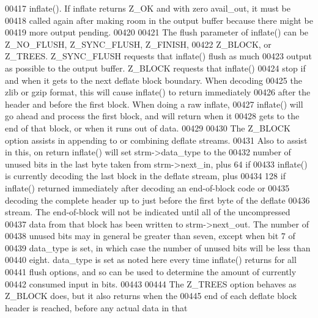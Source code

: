\begin{DoxyCode}
00417 \textcolor{comment}{  inflate().  If inflate returns Z\_OK and with zero avail\_out, it must be}
00418 \textcolor{comment}{  called again after making room in the output buffer because there might be}
00419 \textcolor{comment}{  more output pending.}
00420 \textcolor{comment}{}
00421 \textcolor{comment}{    The flush parameter of inflate() can be Z\_NO\_FLUSH, Z\_SYNC\_FLUSH, Z\_FINISH,}
00422 \textcolor{comment}{  Z\_BLOCK, or Z\_TREES.  Z\_SYNC\_FLUSH requests that inflate() flush as much}
00423 \textcolor{comment}{  output as possible to the output buffer.  Z\_BLOCK requests that inflate()}
00424 \textcolor{comment}{  stop if and when it gets to the next deflate block boundary.  When decoding}
00425 \textcolor{comment}{  the zlib or gzip format, this will cause inflate() to return immediately}
00426 \textcolor{comment}{  after the header and before the first block.  When doing a raw inflate,}
00427 \textcolor{comment}{  inflate() will go ahead and process the first block, and will return when it}
00428 \textcolor{comment}{  gets to the end of that block, or when it runs out of data.}
00429 \textcolor{comment}{}
00430 \textcolor{comment}{    The Z\_BLOCK option assists in appending to or combining deflate streams.}
00431 \textcolor{comment}{  Also to assist in this, on return inflate() will set strm->data\_type to the}
00432 \textcolor{comment}{  number of unused bits in the last byte taken from strm->next\_in, plus 64 if}
00433 \textcolor{comment}{  inflate() is currently decoding the last block in the deflate stream, plus}
00434 \textcolor{comment}{  128 if inflate() returned immediately after decoding an end-of-block code or}
00435 \textcolor{comment}{  decoding the complete header up to just before the first byte of the deflate}
00436 \textcolor{comment}{  stream.  The end-of-block will not be indicated until all of the uncompressed}
00437 \textcolor{comment}{  data from that block has been written to strm->next\_out.  The number of}
00438 \textcolor{comment}{  unused bits may in general be greater than seven, except when bit 7 of}
00439 \textcolor{comment}{  data\_type is set, in which case the number of unused bits will be less than}
00440 \textcolor{comment}{  eight.  data\_type is set as noted here every time inflate() returns for all}
00441 \textcolor{comment}{  flush options, and so can be used to determine the amount of currently}
00442 \textcolor{comment}{  consumed input in bits.}
00443 \textcolor{comment}{}
00444 \textcolor{comment}{    The Z\_TREES option behaves as Z\_BLOCK does, but it also returns when the}
00445 \textcolor{comment}{  end of each deflate block header is reached, before any actual data in that}

\end{DoxyCode}
